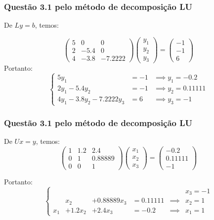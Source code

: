 \begin{frame}
\frametitle{Questão 3.1 pelo método de decomposição LU}
De $Ly=b$, temos:

\[
\begin{pmatrix}
5 & 0 &0 \\
%
2 & -5.4 & 0 \\
%
4 & -3.8 & -7.2222
\end{pmatrix}
\begin{pmatrix}
y_1 \\
y_2 \\
y_3
\end{pmatrix}
=
\begin{pmatrix}
-1\\
-1\\
6
\end{pmatrix}
\]
Portanto:
\[
\left\{
\begin{array}{lll}
5 y_1 &= -1 &\implies y_1 = -0.2\\
2 y_1 -5.4 y_2 &= -1 &\implies y_2 = 0.11111\\
4 y_1 -3.8 y_2 -7.2222 y_3 &= 6 &\implies y_3 = -1
\end{array}
\right.
\]
\end{frame}

\begin{frame}
\frametitle{Questão 3.1 pelo método de decomposição LU}
De $Ux=y$, temos:
\[
\begin{pmatrix}
1 & 1.2 & 2.4\\
0 & 1 & 0.88889 \\
0 & 0 & 1
\end{pmatrix}
%
\begin{pmatrix}
x_1\\
x_2\\
x_3
\end{pmatrix}
%
=
%
\begin{pmatrix}
-0.2\\
0.11111 \\
-1
\end{pmatrix}
\]

Portanto:
\[
\left\{
\begin{array}{rrrlll}
    &          &            &          &        &x_3 = -1 \\
    & x_2      &+0.88889 x_3 &= 0.11111 &\implies&  x_2 = 1\\
x_1 & +1.2 x_2 &+2.4 x_3    &= -0.2    &\implies&  x_1 = 1
\end{array}
\right.
\]
\end{frame}

